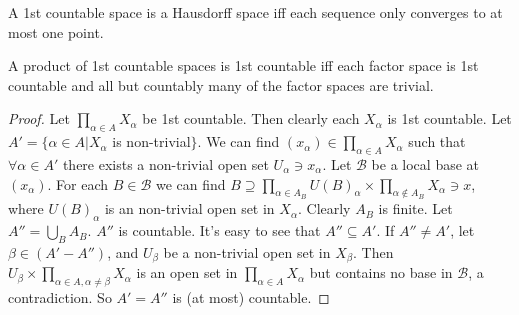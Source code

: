 \documentclass[12pt]{book}
\begin{document}
\begin{theorem}
	A 1st countable space is a Hausdorff space iff each sequence only converges to at most one point.
\end{theorem}

\begin{lemma}
	A product of 1st countable spaces is 1st countable iff each factor space is 1st countable and all but countably many of the factor spaces are trivial.
	\label{lem:1count_prod}
\end{lemma}
\begin{proof}
	Let $\prod_{\alpha\in A} X_\alpha$ be 1st countable. Then clearly each $X_\alpha$ is 1st countable. Let $A'=\{\alpha\in A|X_\alpha$ is non-trivial$\}$. We can find $(x_\alpha)\in\prod_{\alpha\in A} X_\alpha$ such that $\forall \alpha\in A'$ there exists a non-trivial open set $U_\alpha\ni x_\alpha$. Let $\mathcal B$ be a local base at $(x_\alpha)$. For each $B\in \mathcal B$ we can find $B\supseteq \prod_{\alpha\in A_B}U(B)_\alpha\times\prod_{\alpha\not\in A_B}X_\alpha\ni x$, where $U(B)_\alpha$ is an non-trivial open set in $X_\alpha$. Clearly $A_B$ is finite. Let $A''=\bigcup_B A_B$. $A''$ is countable. It's easy to see that $A''\subseteq A'$. If $A''\neq A'$, let $\beta\in (A'-A'')$, and $U_\beta$ be a non-trivial open set in $X_\beta$. Then $U_\beta\times\prod_{\alpha\in A,\alpha\neq\beta}X_\alpha$ is an open set in $\prod_{\alpha\in A} X_\alpha$ but contains no base in $\mathcal B$, a contradiction. So  $A'=A''$ is (at most) countable.
\end{proof}
	
\end{document}
